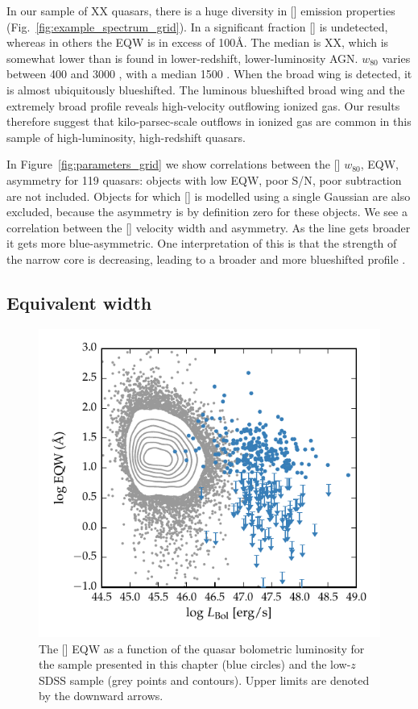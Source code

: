 In our sample of XX quasars, there is a huge diversity in [] emission properties (Fig.~\ref{fig:example_spectrum_grid}). 
In a significant fraction [] is undetected, whereas in others the \ac{EQW} is in excess of 100\AA. 
The median is XX, which is somewhat lower than is found in lower-redshift, lower-luminosity AGN. 
$w_{80}$ varies between 400 and 3000 \kms, with a median 1500 \kms.  
When the broad wing is detected, it is almost ubiquitously blueshifted.
The luminous blueshifted broad wing and the extremely broad profile reveals high-velocity outflowing ionized gas. 
Our results therefore suggest that kilo-parsec-scale outflows in ionized gas are common in this sample of high-luminosity, high-redshift quasars.

In Figure~\ref{fig:parameters_grid} we show correlations between the [] $w_{80}$, EQW, asymmetry for 119 quasars: objects with low \ac{EQW}, poor \ac{S/N}, poor  subtraction are not included. 
Objects for which [] is modelled using a single Gaussian are also excluded, because the asymmetry is by definition zero for these objects.   
We see a correlation between the [] velocity width and asymmetry. 
As the line gets broader it gets more blue-asymmetric. 
One interpretation of this is that the strength of the narrow core is decreasing, leading to a broader and more blueshifted profile \citep[e.g.][]{shen14}. 

\subsection{Equivalent width}

\begin{figure}
    \includegraphics[width=\columnwidth]{figures/chapter04/eqw_lum.pdf} 
    \caption{The [] \ac{EQW} as a function of the quasar bolometric luminosity for the sample presented in this chapter (blue circles) and the low-$z$ \ac{SDSS} sample (grey points and contours). Upper limits are denoted by the downward arrows.}     
    \label{fig:eqw_lum}
\end{figure}

